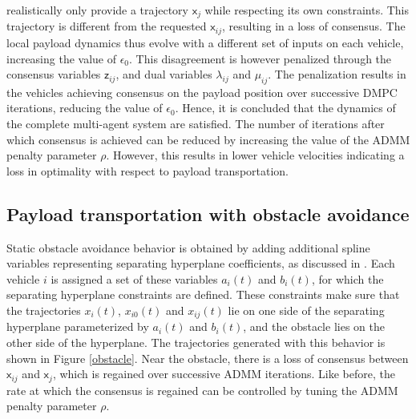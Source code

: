 \documentclass[letterpaper, 10 pt, conference]{ieeeconf}
\newcommand{\cx}{\textsf{x}}
\newcommand{\cz}{\textsf{z}}
\begin{document}
 realistically only provide a trajectory $\cx_j$ while respecting its own constraints. This trajectory is different from the requested $\cx_{ij}$, resulting in a loss of consensus. The local payload dynamics thus evolve with a different set of inputs on each vehicle, increasing the value of $\epsilon_0$. This disagreement is however penalized through the consensus variables $\cz_{ij}$, and dual variables $\lambda_{ij}$ and $\mu_{ij}$. The penalization results in the vehicles achieving consensus on the payload position over successive DMPC iterations, reducing the value of $\epsilon_0$. Hence, it is concluded that the dynamics of the complete multi-agent system are satisfied. The number of iterations after which consensus is achieved can be reduced by increasing the value of the ADMM penalty parameter $\rho$. However, this results in lower vehicle velocities indicating a loss in optimality with respect to payload transportation.
 \\
 \indent
 \subsection{Payload transportation with obstacle avoidance}
Static obstacle avoidance behavior is obtained by adding additional spline variables representing separating hyperplane coefficients, as discussed in \cite{c15}. Each vehicle $i$ is assigned a set of these variables $a_i(t)$ and $b_i(t)$, for which the separating hyperplane constraints are defined. These constraints make sure that the trajectories $x_i(t)$, $x_{i0}(t)$ and $x_{ij}(t)$ lie on one side of the separating hyperplane parameterized by $a_i(t)$ and $b_i(t)$, and the obstacle lies on the other side of the hyperplane. The trajectories generated with this behavior is shown in Figure \ref{obstacle}. Near the obstacle, there is a loss of consensus between $\cx_{ij}$ and $\cx_{j}$, which is regained over successive ADMM iterations. Like before, the rate at which the consensus is regained can be controlled by tuning the ADMM penalty parameter $\rho$.
\end{document}

